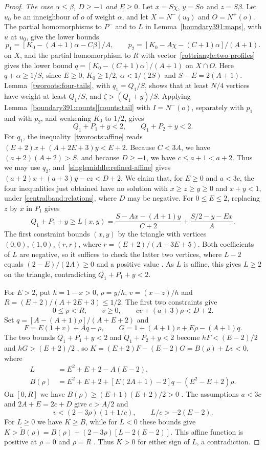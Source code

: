 \begin{proof}
\emph{The case $\alpha\le\beta$, $D\ge-1$ and $E\ge0$.}
Let $x=S\chi$, $y=S\alpha$ and $z=S\beta$. Let $u_0$ be an inneighbour of $o$ of weight $\alpha$, and let
$X=N^-(u_0)$ and $O=N^+(o)$. The partial homomorphisms to $P^-$ and to $L$ in Lemma~\ref{boundary391:maps}, with $u$ at $u_0$, give the lower bounds
\[
 p_1=[K_0-(A+1)\alpha-C\beta]/A,\qquad
 p_2=[K_0-A\chi-(C+1)\alpha]/(A+1).
\]
on $X$, and the partial homomorphism to $R$ with vector~\eqref{rottriangle:two-profiles} gives the lower bound
$q=[K_0-(C+1)\alpha]/(A+1)$ on $X\cap O$.
Here $q+\alpha\ge1/S$, since $E\ge0$, $K_0\ge1/2$,
$\alpha<1/(2S)$ and $S-E=2(A+1)$.
Lemma~\ref{tworoots:four-tails}, with $q_1=Q_1/S$, shows that at least $N/4$ vertices have weight at least $Q_1/S$, and $\zeta>(Q_1+y)/S$. Applying Lemma~\ref{boundary391:counts}\ref{counts:tail} with $I=N^-(o)$, separately with $p_1$ and with $p_2$, and weakening $K_0$ to $1/2$, gives
\[
 Q_1+P_1+y<2,\qquad Q_1+P_2+y<2.
\]
For $q_1$, the inequality~\eqref{tworoots:affine} reads $(E+2)x+(A+2E+3)y<E+2$.
Because $C<3A$, we have $(a+2)(A+2)>S$, and because $D\ge-1$,
we have $c\le a+1<a+2$. Thus we may use $q_2$, and~\eqref{singlemiddle:refined-affine} gives
$(a+2)x+(a+3)y-cz<D+2$.
We claim that, for $E\ge0$ and $a<3c$, the four inequalities just obtained
have no solution with $x\ge z\ge y\ge0$ and $x+y<1$, under
\eqref{centralband:relations}, where $D$ may be negative.\label{centralband:elimination}
For $0\le E\le2$, replacing $z$ by $x$ in $P_1$ gives
\[
 Q_1+P_1+y\ge L(x,y)=
 \frac{S-Ax-(A+1)y}{C+2}+\frac{S/2-y-Ex}{A}.
\]
The first constraint bounds $(x,y)$ by the triangle with vertices
$(0,0),(1,0),(r,r)$, where $r=(E+2)/(A+3E+5)$.
Both coefficients of $L$ are negative, so it suffices to check
the latter two vertices, where $L-2$ equals $(2-E)/(2A)\ge0$ and a
positive value .
As $L$ is affine, this gives $L\ge2$ on the triangle, contradicting $Q_1+P_1+y<2$.

For $E>2$, put $h=1-x>0$, $\rho=y/h$, $v=(x-z)/h$ and
$R=(E+2)/(A+2E+3)\le1/2$. The first two constraints give
\[
 0\le\rho<R,\qquad v\ge0,\qquad cv+(a+3)\rho<D+2.
\]
Set $q=[A-(A+1)\rho]/(A+E+2)$ and
\[
 F=E(1+v)+Aq-\rho,\qquad
 G=1+(A+1)v+E\rho-(A+1)q.
\]
The two bounds $Q_1+P_1+y<2$ and $Q_1+P_2+y<2$ become
$hF<(E-2)/2$ and $hG>(E+2)/2$ , so $K=(E+2)F-(E-2)G=B(\rho)+Lv<0$, where
\[
\begin{split}
 L&=E^2+E+2-A(E-2),\\
 B(\rho)&=E^2+E+2+[E(2A+1)-2]q-(E^2-E+2)\rho.
\end{split}
\]
On $[0,R]$ we have $B(\rho)\ge(E+1)(E+2)/2>0$ . The assumptions
$a<3c$ and $2A+E=2c+D$ give $c>A/2$ and
\[
 v<(2-3\rho)(1+1/c),\qquad L/c>-2(E-2).
\]
For $L\ge0$ we have $K\ge B$, while for $L<0$ these bounds give
$K>\widetilde B(\rho)=B(\rho)+(2-3\rho)[L-2(E-2)]$. This affine function
is positive at $\rho=0$ and $\rho=R$ .
Thus $K>0$ for either sign of $L$, a contradiction.


\end{proof}

